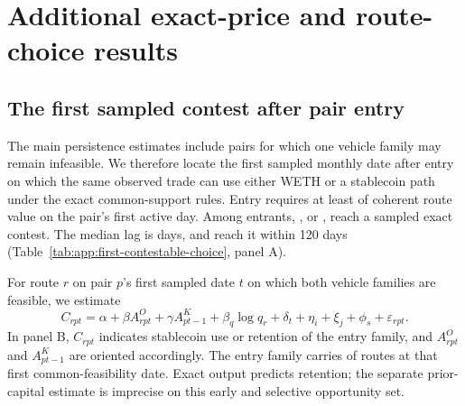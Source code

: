 \section{Additional exact-price and route-choice results}
\label{app:additional-price-results}

\subsection{The first sampled contest after pair entry}

The main persistence estimates include pairs for which one vehicle family may remain infeasible. We therefore locate the first sampled monthly date after entry on which the same observed trade can use either WETH or a stablecoin path under the exact common-support rules. Entry requires at least \FirstContestEntryValueThreshold{} of coherent route value on the pair's first active day. Among \FirstContestEntryPairs{} entrants, \FirstContestPairs{}, or \FirstContestCoverage{}, reach a sampled exact contest. The median lag is \FirstContestMedianLagDays{} days, and \FirstContestWithinOneTwenty{} reach it within 120 days (Table~\ref{tab:app:first-contestable-choice}, panel A).

For route $r$ on pair $p$'s first sampled date $t$ on which both vehicle families are feasible, we estimate
\begin{equation}
\label{eq:app:first-contestable-choice}
C_{rpt}=\alpha+\beta A^O_{rpt}+\gamma A^K_{pt-1}
       +\beta_q\log q_r+\delta_t+\eta_i+\xi_j+\phi_s+\varepsilon_{rpt}.
\end{equation}
In panel B, $C_{rpt}$ indicates stablecoin use or retention of the entry family, and $A^O_{rpt}$ and $A^K_{pt-1}$ are oriented accordingly. The entry family carries \FirstContestRouteRetention{} of routes at that first common-feasibility date. Exact output predicts retention; the separate prior-capital estimate is imprecise on this early and selective opportunity set.


